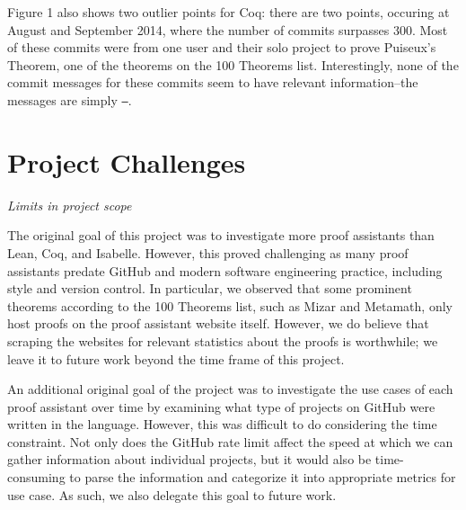 \documentclass[sigconf,nonacm]{acmart}
\begin{document}
Figure 1 also shows two outlier points for Coq: there are two points, occuring at August and September 2014, where the number of commits surpasses 300. Most of these commits were from one user and their solo project to prove Puiseux's Theorem, one of the theorems on the 100 Theorems list. Interestingly, none of the commit messages for these commits seem to have relevant information--the messages are simply \texttt{--}.


\section{Project Challenges}

\textit{Limits in project scope}

The original goal of this project was to investigate more proof assistants than Lean, Coq, and Isabelle. However, this proved challenging as many proof assistants predate GitHub and modern software engineering practice, including style and version control. In particular, we observed that some prominent theorems according to the 100 Theorems list, such as Mizar and Metamath, only host proofs on the proof assistant website itself. However, we do believe that scraping the websites for relevant statistics about the proofs is worthwhile; we leave it to future work beyond the time frame of this project.

An additional original goal of the project was to investigate the use cases of each proof assistant over time by examining what type of projects on GitHub were written in the language. However, this was difficult to do considering the time constraint. Not only does the GitHub rate limit affect the speed at which we can gather information about individual projects, but it would also be time-consuming to parse the information and categorize it into appropriate metrics for use case. As such, we also delegate this goal to future work. 
\end{document}
